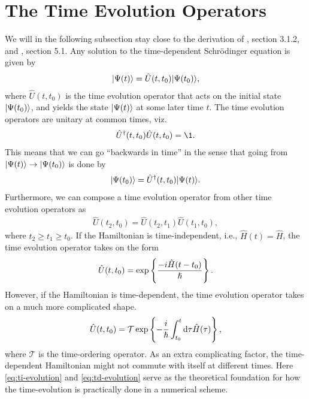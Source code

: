     \section{The Time Evolution Operators}
        We will in the following subsection stay close to the derivation of
        \citeauthor{ullrich2011time} \cite{ullrich2011time}, section 3.1.2, and
        \citeauthor{joachain2012atoms} \cite{joachain2012atoms}, section 5.1.
        Any solution to the time-dependent Schrödinger equation is given by
        \begin{align}
            | \Psi(t) \rangle = \hat{U}(t, t_0)| \Psi(t_0) \rangle,
        \end{align}
        where $\hat{U}(t, t_0)$ is the time evolution operator that acts on the
        initial state $| \Psi(t_0) \rangle$, and yields the state $| \Psi(t) \rangle$ at
        some later time $t$. The time evolution operators are unitary at common
        times, viz.
        \begin{align}
            \hat{U}^{\dagger}(t, t_0)\hat{U}(t, t_0) = \1.
        \end{align}
        This means that we can go ``backwards in time'' in the sense that going
        from $| \Psi(t) \rangle \to | \Psi(t_0) \rangle$ is done by
        \begin{align}
            | \Psi(t_0) \rangle = \hat{U}^{\dagger}(t, t_0)| \Psi(t) \rangle.
        \end{align}
        Furthermore, we can compose a time evolution operator from other time
        evolution operators as
        \begin{align}
            \hat{U}(t_2, t_0) = \hat{U}(t_2, t_1)\hat{U}(t_1, t_0),
        \end{align}
        where $t_2 \geq t_1 \geq t_0$. If the Hamiltonian is time-independent,
        i.e., $\hat{H}(t) = \hat{H}$, the time evolution operator takes on the
        form
        \begin{align}
            \hat{U}(t, t_0) = \exp\left\{ 
                \frac{-i \hat{H} (t - t_0)}{\hslash}
             \right\}.
            \label{eq:ti-evolution}
        \end{align}
        However, if the Hamiltonian is time-dependent, the time evolution
        operator takes on a much more complicated shape.
        \begin{align}
            \hat{U}(t, t_0) =
            \mathcal{T}\exp\left\{ 
                -\frac{i}{\hslash} \int_{t_0}^{t} \mathrm{d}\tau
                \hat{H}(\tau)
             \right\},
            \label{eq:td-evolution}
        \end{align}
        where $\mathcal{T}$ is the time-ordering operator. As an extra
        complicating factor, the time-dependent Hamiltonian might not commute
        with itself at different times. Here \autoref{eq:ti-evolution} and
        \autoref{eq:td-evolution} serve as the theoretical foundation for how
        the time-evolution is practically done in a numerical scheme.


